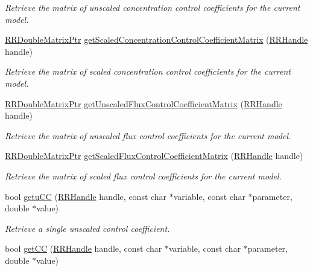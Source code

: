 \begin{DoxyCompactItemize}
\begin{DoxyCompactList}\small\item\em Retrieve the matrix of unscaled concentration control coefficients for the current model. \end{DoxyCompactList}\item 
\hyperlink{rrc__types_8h_ae586a879d30f0823087e42d93464b5dd}{R\-R\-Double\-Matrix\-Ptr} \hyperlink{group__mca_ga9933c9181db0991fd502e76a1151a98f}{get\-Scaled\-Concentration\-Control\-Coefficient\-Matrix} (\hyperlink{rrc__types_8h_a1d68f0592372208fa5a5f2799ea4b3ae}{R\-R\-Handle} handle)
\begin{DoxyCompactList}\small\item\em Retrieve the matrix of scaled concentration control coefficients for the current model. \end{DoxyCompactList}\item 
\hyperlink{rrc__types_8h_ae586a879d30f0823087e42d93464b5dd}{R\-R\-Double\-Matrix\-Ptr} \hyperlink{group__mca_ga814b6a3331bd0e31f59b0c2ef82f6a1c}{get\-Unscaled\-Flux\-Control\-Coefficient\-Matrix} (\hyperlink{rrc__types_8h_a1d68f0592372208fa5a5f2799ea4b3ae}{R\-R\-Handle} handle)
\begin{DoxyCompactList}\small\item\em Retrieve the matrix of unscaled flux control coefficients for the current model. \end{DoxyCompactList}\item 
\hyperlink{rrc__types_8h_ae586a879d30f0823087e42d93464b5dd}{R\-R\-Double\-Matrix\-Ptr} \hyperlink{group__mca_ga4428693777e8c5e858709a455495d653}{get\-Scaled\-Flux\-Control\-Coefficient\-Matrix} (\hyperlink{rrc__types_8h_a1d68f0592372208fa5a5f2799ea4b3ae}{R\-R\-Handle} handle)
\begin{DoxyCompactList}\small\item\em Retrieve the matrix of scaled flux control coefficients for the current model. \end{DoxyCompactList}\item 
bool \hyperlink{group__mca_gae8316aebf007cc8ea676ac3ed1ed1168}{getu\-C\-C} (\hyperlink{rrc__types_8h_a1d68f0592372208fa5a5f2799ea4b3ae}{R\-R\-Handle} handle, const char $\ast$variable, const char $\ast$parameter, double $\ast$value)
\begin{DoxyCompactList}\small\item\em Retrieve a single unscaled control coefficient. \end{DoxyCompactList}\item 
bool \hyperlink{group__mca_ga65db235364c7a461c95b95cf492a8f8b}{get\-C\-C} (\hyperlink{rrc__types_8h_a1d68f0592372208fa5a5f2799ea4b3ae}{R\-R\-Handle} handle, const char $\ast$variable, const char $\ast$parameter, double $\ast$value)

\end{DoxyCompactItemize}
